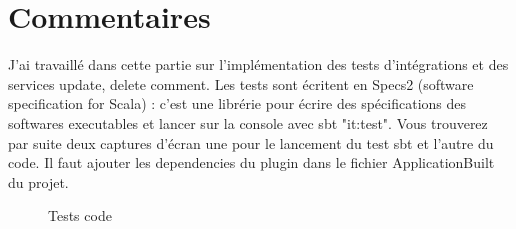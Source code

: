 \section{Commentaires}
J'ai travaillé dans cette partie sur l'implémentation des tests d'intégrations et des services update, delete comment.
Les tests sont écritent en Specs2 (software specification for Scala) : c'est une librérie pour écrire des spécifications des softwares executables et lancer sur la console avec sbt "it:test".
Vous trouverez par suite deux captures d'écran une pour le lancement du test sbt et l'autre du code.
Il faut ajouter les dependencies du plugin dans le fichier ApplicationBuilt du projet.

\begin{figure}[H]
\begin{minipage}[c]{.7\linewidth}
\begin{center}
\caption{Tests code}
\label{fig:Tests code}
\end{center}
\end{minipage}
\hfill
\begin{minipage}[c]{.5\linewidth}
\begin{center}
\hspace{1em}

\end{center}
\end{minipage}
\end{figure}
